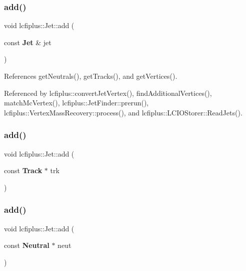 \subsubsection{add()\hspace{0.1cm}{\footnotesize\ttfamily [1/4]}}
{\footnotesize\ttfamily void lcfiplus\+::\+Jet\+::add (\begin{DoxyParamCaption}\item[{const \textbf{ Jet} \&}]{jet }\end{DoxyParamCaption})}



References get\+Neutrals(), get\+Tracks(), and get\+Vertices().



Referenced by lcfiplus\+::convert\+Jet\+Vertex(), find\+Additional\+Vertices(), match\+Mc\+Vertex(), lcfiplus\+::\+Jet\+Finder\+::prerun(), lcfiplus\+::\+Vertex\+Mass\+Recovery\+::process(), and lcfiplus\+::\+L\+C\+I\+O\+Storer\+::\+Read\+Jets().

\mbox{\label{classlcfiplus_1_1Jet_a081c8fac6f644bb9a114da705ba3f2b9}} 
\subsubsection{add()\hspace{0.1cm}{\footnotesize\ttfamily [2/4]}}
{\footnotesize\ttfamily void lcfiplus\+::\+Jet\+::add (\begin{DoxyParamCaption}\item[{const \textbf{ Track} $\ast$}]{trk }\end{DoxyParamCaption})\hspace{0.3cm}{\ttfamily [inline]}}

\mbox{\label{classlcfiplus_1_1Jet_a556ef122a6ffb3b56dc4b7131e9ffc8a}} 
\subsubsection{add()\hspace{0.1cm}{\footnotesize\ttfamily [3/4]}}
{\footnotesize\ttfamily void lcfiplus\+::\+Jet\+::add (\begin{DoxyParamCaption}\item[{const \textbf{ Neutral} $\ast$}]{neut }\end{DoxyParamCaption})\hspace{0.3cm}{\ttfamily [inline]}}

